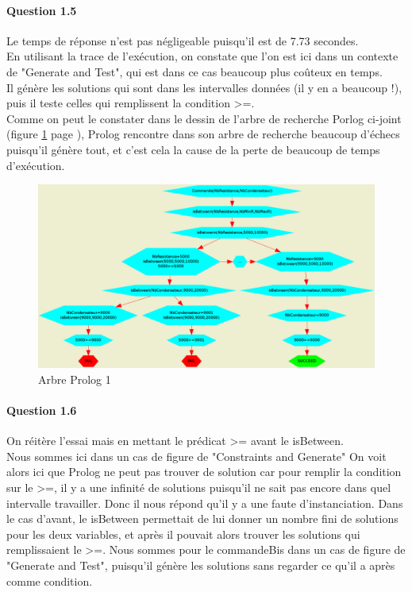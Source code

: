 \documentclass[11pt]{article} %
\begin{document}
\paragraph{Question 1.5}
Le temps de réponse n'est pas négligeable puisqu'il est de 7.73 secondes.\\
En utilisant la trace de l'exécution, on constate que l'on est ici dans un contexte de "Generate and Test",
qui est dans ce cas beaucoup plus coûteux en temps.\\
Il génère les solutions qui sont dans les intervalles données (il y en a beaucoup !),
puis il teste celles qui remplissent la condition >=.\\
Comme on peut le constater dans le dessin de l'arbre de recherche Porlog ci-joint (figure \ref{arbre1} page \pageref{arbre1}), Prolog rencontre
dans son arbre de recherche beaucoup d'échecs puisqu'il génère tout, et c'est cela la cause de la perte de
beaucoup de temps d'exécution.
\begin{figure}
\includegraphics[width=15cm]{tp1.png}
\caption{\label{arbre1}Arbre Prolog 1}
\end{figure}
\paragraph{Question 1.6}
On réitère l'essai mais en mettant le prédicat >= avant le isBetween.\\
Nous sommes ici dans un cas de figure de "Constraints and Generate"
On voit alors ici que Prolog ne peut pas trouver de solution car pour remplir la condition
sur le >=, il y a une infinité de solutions puisqu'il ne sait pas encore dans quel intervalle travailler.
Donc il nous répond qu'il y a une faute d'instanciation.
Dans le cas d'avant, le isBetween permettait de lui donner un nombre fini de solutions pour les deux variables,
et après il pouvait alors trouver les solutions qui remplissaient le >=.
Nous sommes pour le commandeBis dans un cas de figure de "Generate and Test", puisqu'il génère les solutions sans
regarder ce qu'il a après comme condition.
\end{document}

